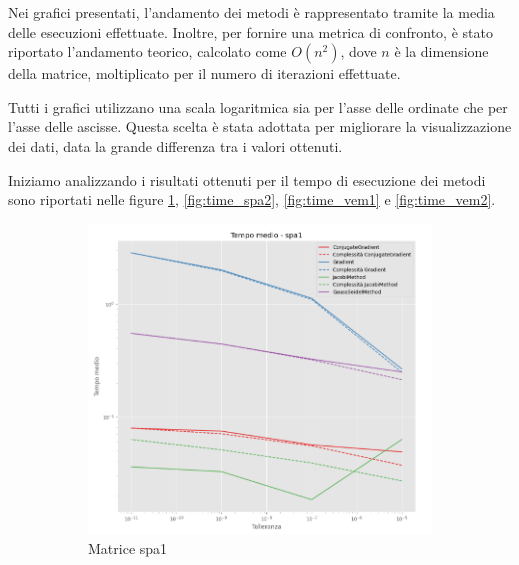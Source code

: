 Nei grafici presentati, l'andamento dei metodi è rappresentato tramite la media
delle esecuzioni effettuate. Inoltre, per fornire una metrica di confronto, è
stato riportato l'andamento teorico, calcolato come $O(n^2)$, dove $n$ è la
dimensione della matrice, moltiplicato per il numero di iterazioni effettuate.

Tutti i grafici utilizzano una scala logaritmica sia per l'asse delle ordinate
che per l'asse delle ascisse. Questa scelta è stata adottata per migliorare la
visualizzazione dei dati, data la grande differenza tra i valori ottenuti.

Iniziamo analizzando i risultati ottenuti per il tempo di esecuzione dei metodi
sono riportati nelle figure \ref{fig:time_spa1}, \ref{fig:time_spa2}, \ref{fig:time_vem1}
e \ref{fig:time_vem2}.
\begin{figure}[!ht]
    \centering
    \begin{subfigure}{0.45\textwidth}
        \centering
        \includegraphics[width=\textwidth]{./../report/Progetto_1_bis/img/time_spa1.png}
        \caption{Matrice spa1}
        \label{fig:time_spa1}
    \end{subfigure}
    \hfill
    \begin{subfigure}{0.45\textwidth}
        \centering

\end{subfigure}
\end{figure}
